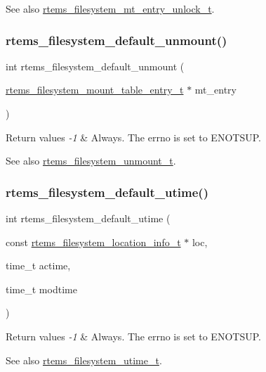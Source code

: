 \begin{DoxySeeAlso}{See also}
\mbox{\hyperlink{group__LibIOFSOps_ga9a04cab210f543206c54fc78877cb884}{rtems\+\_\+filesystem\+\_\+mt\+\_\+entry\+\_\+unlock\+\_\+t}}. 
\end{DoxySeeAlso}
\mbox{\label{group__LibIOFSOps_ga0fe302d1177a5be4f6b69110240cb08a}} 
\subsubsection{\texorpdfstring{rtems\_filesystem\_default\_unmount()}{rtems\_filesystem\_default\_unmount()}}
{\footnotesize\ttfamily int rtems\+\_\+filesystem\+\_\+default\+\_\+unmount (\begin{DoxyParamCaption}\item[{\mbox{\hyperlink{structrtems__filesystem__mount__table__entry__tt}{rtems\+\_\+filesystem\+\_\+mount\+\_\+table\+\_\+entry\+\_\+t}} $\ast$}]{mt\+\_\+entry }\end{DoxyParamCaption})}


\begin{DoxyRetVals}{Return values}
{\em -\/1} & Always. The errno is set to E\+N\+O\+T\+S\+UP.\\
\hline
\end{DoxyRetVals}
\begin{DoxySeeAlso}{See also}
\mbox{\hyperlink{group__LibIOFSOps_ga4eab60ad75d332e4ee4b1ee7ffb95690}{rtems\+\_\+filesystem\+\_\+unmount\+\_\+t}}. 
\end{DoxySeeAlso}
\mbox{\label{group__LibIOFSOps_ga3c2daf1a049f27cbaa4ce8726b519a11}} 
\subsubsection{\texorpdfstring{rtems\_filesystem\_default\_utime()}{rtems\_filesystem\_default\_utime()}}
{\footnotesize\ttfamily int rtems\+\_\+filesystem\+\_\+default\+\_\+utime (\begin{DoxyParamCaption}\item[{const \mbox{\hyperlink{group__LibIO_ga3252b3d31ee3c49ffff0b7604a676864}{rtems\+\_\+filesystem\+\_\+location\+\_\+info\+\_\+t}} $\ast$}]{loc,  }\item[{time\+\_\+t}]{actime,  }\item[{time\+\_\+t}]{modtime }\end{DoxyParamCaption})}


\begin{DoxyRetVals}{Return values}
{\em -\/1} & Always. The errno is set to E\+N\+O\+T\+S\+UP.\\
\hline
\end{DoxyRetVals}
\begin{DoxySeeAlso}{See also}
\mbox{\hyperlink{group__LibIOFSOps_ga7b4bd5a75a776c42f1e09159406e2c94}{rtems\+\_\+filesystem\+\_\+utime\+\_\+t}}. 
\end{DoxySeeAlso}

